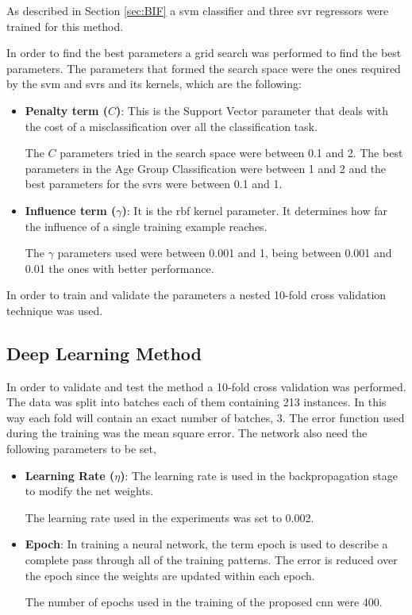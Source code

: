As described in Section \ref{sec:BIF} a \gls{svm} classifier and three \gls{svr} regressors were trained for this method. 

In order to find the best parameters a grid search was performed to find the best parameters. The parameters that formed the search space were the ones required by the \gls{svm} and \glspl{svr} and its kernels, which are the following:

\begin{itemize}
	\item \textbf{Penalty term ($C$)}: This is the Support Vector parameter that deals with the cost of a misclassification over all the classification task. 
	
	The $C$ parameters tried in the search space were between 0.1 and 2. The best parameters in the Age Group Classification were between 1 and 2 and the best parameters for the \glspl{svr} were between 0.1 and 1.
	
	\item \textbf{Influence term ($\gamma$)}: It is the \gls{rbf} kernel parameter. It determines how far the influence of a single training example reaches.
	
	The $\gamma$ parameters used were between 0.001 and 1, being between 0.001 and 0.01 the ones with better performance.
\end{itemize}

In order to train and validate the parameters a nested 10-fold cross validation technique was used.

\subsection{Deep Learning Method}

In order to validate and test the method a 10-fold cross validation was performed. The data was split into batches each of them containing 213 instances. In this way each fold will contain an exact number of batches, 3. The error function used during the training was the mean square error. The network also need the following parameters to be set,

\begin{itemize}
	\item \textbf{Learning Rate ($\eta $)}: The learning rate is used in the backpropagation stage to modify the net weights.
	
	The learning rate used in the experiments was set to 0.002. 
	
	\item \textbf{Epoch}: In training a neural network, the term epoch is used to describe a complete pass through all of the training patterns. The error is reduced over the epoch since the weights are updated within each epoch.
	
	The number of epochs used in the training of the proposed \gls{cnn} were 400.
\end{itemize}

